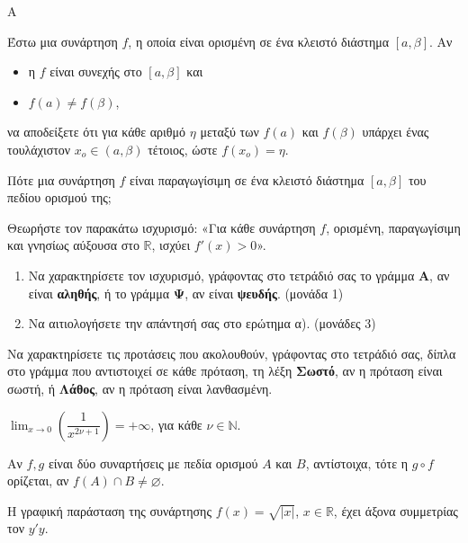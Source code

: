 \begin{thema}{Α}
\begin{erwthma}
    \item Έστω μια συνάρτηση $f$, η οποία είναι ορισμένη σε ένα κλειστό διάστημα $[a, \beta]$. Αν
    \begin{itemize}
        \item η $f$ είναι συνεχής στο $[a, \beta]$ και
        \item $f(a) \neq f(\beta)$,
    \end{itemize}
    να αποδείξετε ότι για κάθε αριθμό $\eta$ μεταξύ των $f(a)$ και $f(\beta)$ υπάρχει ένας τουλάχιστον $x_o \in (a, \beta)$ τέτοιος, ώστε $f(x_o) = \eta$. 

    \item Πότε μια συνάρτηση $f$ είναι παραγωγίσιμη σε ένα κλειστό διάστημα $[a, \beta]$ του πεδίου ορισμού της; 

    \item Θεωρήστε τον παρακάτω ισχυρισμό: «Για κάθε συνάρτηση $f$, ορισμένη, παραγωγίσιμη και γνησίως αύξουσα στο $\mathbb{R}$, ισχύει $f'(x) > 0$».
    \begin{enumerate}[label=\alph*)]
        \item Να χαρακτηρίσετε τον ισχυρισμό, γράφοντας στο τετράδιό σας το γράμμα \textbf{Α}, αν είναι \textbf{αληθής}, ή το γράμμα \textbf{Ψ}, αν είναι \textbf{ψευδής}. \hfill (μονάδα 1)
        \item Να αιτιολογήσετε την απάντησή σας στο ερώτημα α). \hfill (μονάδες 3)
    \end{enumerate}

    \item Να χαρακτηρίσετε τις προτάσεις που ακολουθούν, γράφοντας στο τετράδιό σας, δίπλα στο γράμμα που αντιστοιχεί σε κάθε πρόταση, τη λέξη \textbf{Σωστό}, αν η πρόταση είναι σωστή, ή \textbf{Λάθος}, αν η πρόταση είναι λανθασμένη.
    \begin{alist}
        \item $\displaystyle\lim_{x \to 0}\!\left(\dfrac{1}{x^{2\nu+1}}\right) = +\infty$, για κάθε $\nu \in \mathbb{N}$.

        \item Αν $f, g$ είναι δύο συναρτήσεις με πεδία ορισμού $A$ και $B$, αντίστοιχα, τότε η $g \circ f$ ορίζεται, αν $f(A) \cap B \neq \varnothing$.

        \item Η γραφική παράσταση της συνάρτησης $f(x) = \sqrt{|x|}$, $x \in \mathbb{R}$, έχει άξονα συμμετρίας τον $y'y$.


\end{alist}
\end{erwthma}
\end{thema}
